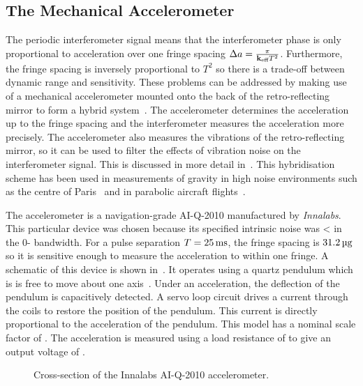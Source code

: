 \subsection{The Mechanical Accelerometer}\label{subsec:raman_mems}
The periodic interferometer signal means that the interferometer phase is only
proportional to acceleration over one fringe spacing \(\Delta a =
\frac{\pi}{{\textbf k_\textnormal{eff}} T^2}\). Furthermore, the fringe spacing is inversely
proportional to \(T^2\) so there is a trade-off between dynamic range and
sensitivity. These problems can be addressed by making use of a mechanical
accelerometer mounted onto the back of the retro-reflecting mirror to form a
hybrid system~\cite{Lautier2014}. The accelerometer determines the acceleration
up to the fringe spacing  and the interferometer measures the acceleration more
precisely. The accelerometer also measures the vibrations of the
retro-reflecting mirror, so it can be used to filter the effects of vibration
noise on the interferometer signal. This is discussed in more detail
in~. This hybridisation scheme has been
used in measurements of gravity in high noise environments such as the centre of
Paris~\cite{Merlet2009} and in parabolic aircraft
flights~\cite{Geiger2011a,Barrett2016}. \par\noindent The accelerometer is a
navigation-grade AI-Q-2010 manufactured by \textit{Innalabs}. This particular
device was chosen because its specified intrinsic noise was
< in the 0- bandwidth. For a pulse separation \(T
= \sivalue{25}{\milli\second}\), the fringe spacing is
\(\sivalue{31.2}{\micro\g}\) so it is sensitive enough to measure the
acceleration to within one fringe. A schematic of this device is shown
in~. It operates using a quartz pendulum which is is
free to move about one
axis~\cite{Foote1992,Lawrence1998}\nocite{Lawrence1998a}. Under an acceleration, the
deflection of the pendulum is capacitively detected. A servo loop circuit drives
a current through the coils to restore the position of the pendulum. This
current is directly proportional to the acceleration of the pendulum. This model
has a nominal scale factor of . The
acceleration is measured using a load resistance of  to
give an output voltage of .
\begin{figure}[!htbp] \centering
	\resizebox{0.5\textwidth}{!}{}
	\caption[Innalabs accelerometer cross-section]{Cross-section of the Innalabs
		AI-Q-2010 accelerometer.} \label{fig:innalabs}
\end{figure}

